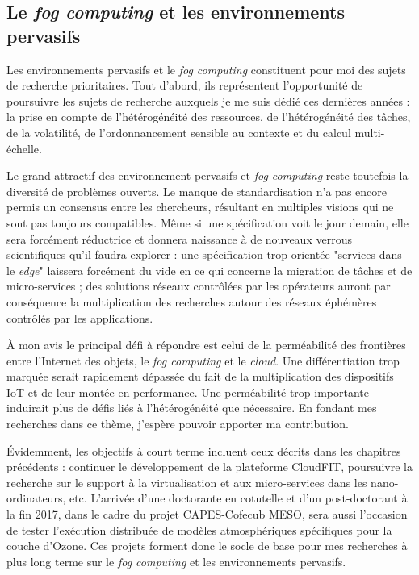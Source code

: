 \subsection*{Le \textit{fog computing} et les environnements pervasifs}

Les environnements pervasifs et le \textit{fog computing} constituent pour moi des sujets de recherche prioritaires. Tout d'abord, ils représentent l'opportunité de poursuivre les sujets de recherche auxquels je me suis dédié ces dernières années : la prise en compte de l'hétérogénéité des ressources, de l'hétérogénéité des tâches, de la volatilité, de l'ordonnancement sensible au contexte et du calcul multi-échelle. 

Le grand attractif des environnement pervasifs et \textit{fog computing} reste toutefois la diversité de problèmes ouverts. Le manque de standardisation n'a pas encore permis un consensus entre les chercheurs, résultant en multiples visions qui ne sont pas toujours compatibles. Même si une spécification voit le jour demain, elle sera forcément réductrice et donnera naissance à de nouveaux verrous scientifiques qu'il faudra explorer : une spécification trop orientée "services dans le \textit{edge}" laissera forcément du vide en ce qui concerne la migration de tâches et de micro-services ; des solutions réseaux contrôlées par les opérateurs auront par conséquence la multiplication des recherches autour des réseaux éphémères contrôlés par les applications. 
 
 À mon avis le principal défi à répondre est celui de la perméabilité des frontières entre l'Internet des objets, le \textit{fog computing} et le \textit{cloud}. Une différentiation trop marquée serait rapidement dépassée du fait de la multiplication des dispositifs IoT et de leur montée en performance. Une perméabilité trop importante induirait plus de défis liés à l'hétérogénéité que nécessaire. En fondant mes recherches dans ce thème, j'espère pouvoir apporter ma contribution.
 
Évidemment, les objectifs à court terme incluent ceux décrits dans les chapitres précédents : continuer le développement de la plateforme CloudFIT, poursuivre la recherche sur le support à la virtualisation et aux micro-services dans les nano-ordinateurs, etc. L'arrivée d'une doctorante en cotutelle et d'un post-doctorant à la fin 2017, dans le cadre du projet CAPES-Cofecub MESO, sera aussi l'occasion de tester l'exécution distribuée de modèles atmosphériques spécifiques pour la couche d'Ozone. Ces projets forment donc le socle de base pour mes recherches à plus long terme sur le \textit{fog computing} et les environnements pervasifs.  

